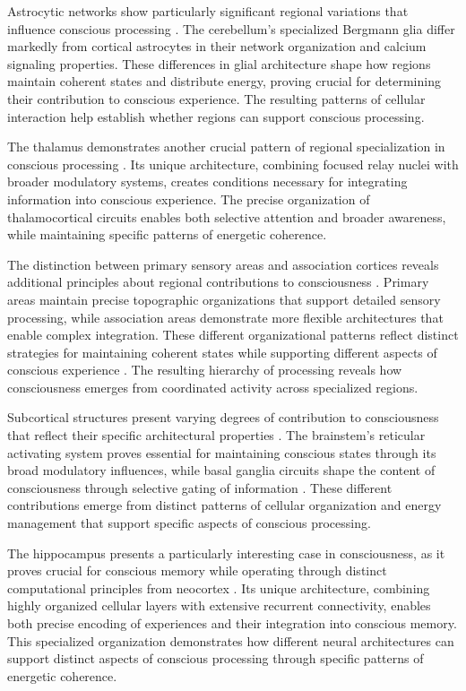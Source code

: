 \begin{refsection}
Astrocytic networks show particularly significant regional variations that influence conscious processing \cite{Buckner2008}. The cerebellum's specialized Bergmann glia differ markedly from cortical astrocytes in their network organization and calcium signaling properties. These differences in glial architecture shape how regions maintain coherent states and distribute energy, proving crucial for determining their contribution to conscious experience. The resulting patterns of cellular interaction help establish whether regions can support conscious processing.

The thalamus demonstrates another crucial pattern of regional specialization in conscious processing \cite{Balleine2010}. Its unique architecture, combining focused relay nuclei with broader modulatory systems, creates conditions necessary for integrating information into conscious experience. The precise organization of thalamocortical circuits enables both selective attention and broader awareness, while maintaining specific patterns of energetic coherence.

The distinction between primary sensory areas and association cortices reveals additional principles about regional contributions to consciousness \cite{Shulman1997}. Primary areas maintain precise topographic organizations that support detailed sensory processing, while association areas demonstrate more flexible architectures that enable complex integration. These different organizational patterns reflect distinct strategies for maintaining coherent states while supporting different aspects of conscious experience \cite{Allen2016}. The resulting hierarchy of processing reveals how consciousness emerges from coordinated activity across specialized regions.

Subcortical structures present varying degrees of contribution to consciousness that reflect their specific architectural properties \cite{Lou2004}. The brainstem's reticular activating system proves essential for maintaining conscious states through its broad modulatory influences, while basal ganglia circuits shape the content of consciousness through selective gating of information \cite{Parvizi2001}. These different contributions emerge from distinct patterns of cellular organization and energy management that support specific aspects of conscious processing.

The hippocampus presents a particularly interesting case in consciousness, as it proves crucial for conscious memory while operating through distinct computational principles from neocortex \cite{Vogt2005}. Its unique architecture, combining highly organized cellular layers with extensive recurrent connectivity, enables both precise encoding of experiences and their integration into conscious memory. This specialized organization demonstrates how different neural architectures can support distinct aspects of conscious processing through specific patterns of energetic coherence.


\end{refsection}
